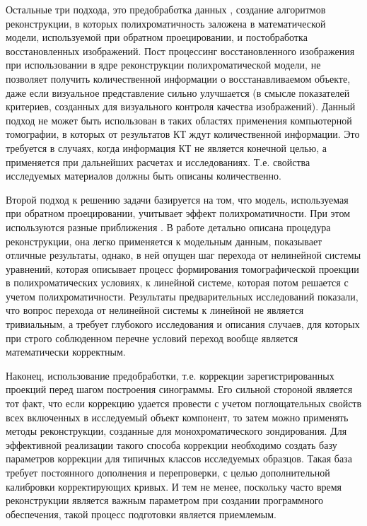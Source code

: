 Остальные три подхода, это предобработка данных \cite{dewulf2012sense}, создание алгоритмов реконструкции, в которых полихроматичность заложена в математической модели, используемой при обратном проецировании, и постобработка восстановленных изображений. 
Пост процессинг восстановленного изображения \cite{krumm2008reducing} при использовании в ядре реконструкции полихроматической модели, не позволяет получить количественной информации о восстанавливаемом объекте, даже если визуальное представление сильно улучшается (в смысле показателей критериев, созданных для визуального контроля качества изображений).
Данный подход не может быть использован в таких областях применения компьютерной томографии, в которых от результатов КТ ждут количественной информации.
Это требуется в случаях, когда информация КТ не является конечной целью, а применяется при дальнейших расчетах и исследованиях.
Т.е. свойства исследуемых материалов должны быть описаны количественно.

Второй подход к решению задачи базируется на том, что модель, используемая при обратном проецировании, учитывает эффект полихроматичности.
При этом используются разные приближения \cite{stenner2010dynamic, van2011iterative}.
В работе \cite{brabant2012novel} детально описана процедура реконструкции, она легко применяется к модельным данным, показывает отличные результаты, однако, в ней опущен шаг перехода от нелинейной системы уравнений, которая описывает процесс формирования томографической проекции в полихроматических условиях, к линейной системе, которая потом решается с учетом полихроматичности.
Результаты предварительных исследований показали, что вопрос перехода от нелинейной системы к линейной не является тривиальным, а требует глубокого исследования и описания случаев, для которых при строго соблюденном перечне условий переход вообще является математически корректным.

Наконец, использование предобработки, т.е. коррекции зарегистрированных проекций перед шагом построения синограммы.
Его сильной стороной является тот факт, что если коррекцию удается провести с учетом поглощательных свойств всех включенных в исследуемый объект компонент, то затем можно применять методы реконструкции, созданные для монохроматического зондирования.
Для эффективной реализации такого способа коррекции необходимо создать базу параметров коррекции для типичных классов исследуемых образцов.
Такая база требует постоянного дополнения и перепроверки, с целью дополнительной калибровки корректирующих кривых.
И тем не менее, поскольку часто время реконструкции является важным параметром при создании программного обеспечения, такой процесс подготовки является приемлемым.